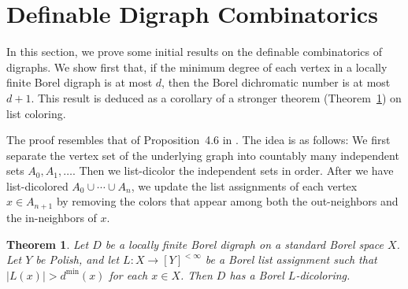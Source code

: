\documentclass[psamsfonts]{amsart}
\newtheorem{thm}{Theorem}[section]
\theoremstyle{definition}
\theoremstyle{remark}
\numberwithin{equation}{section}
\begin{document}
\section{Definable Digraph Combinatorics}
In this section, we prove some initial results on the definable combinatorics of digraphs. We show first that, if the minimum degree of each vertex in a locally finite Borel digraph is at most $d$, then the Borel dichromatic number is at most $d + 1$. This result is deduced as a corollary of a stronger theorem (Theorem~\ref{thm:degplusone}) on list coloring.

The proof resembles that of Proposition~4.6 in \cite{kst1999}. The idea is as follows: We first separate the vertex set of the underlying graph into countably many independent sets $A_0, A_1, \dots$. Then we list-dicolor the independent sets in order. After we have list-dicolored $A_0 \cup \cdots \cup A_n$, we update the list assignments of each vertex $x \in A_{n + 1}$ by removing the colors that appear among both the out-neighbors and the in-neighbors of $x$.

\begin{thm}
\label{thm:degplusone}
    Let $D$ be a locally finite Borel digraph on a standard Borel space $X$. Let $Y$ be Polish, and let $L : X \to [Y]^{< \infty}$ be a Borel list assignment such that $\vert L(x) \vert > d^{\min}(x)$ for each $x \in X$. Then $D$ has a Borel $L$-dicoloring.
\end{thm}
\end{document}
